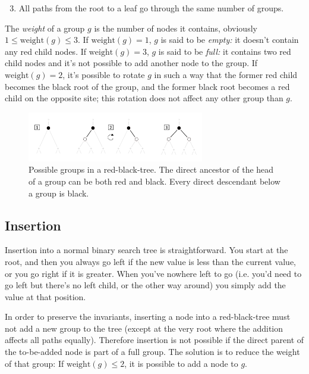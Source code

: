 \documentclass{article}
\begin{document}
\begin{enumerate}[label=(\arabic*)]
\setcounter{enumi}{2}
\item All paths from the root to a leaf go through the same number of groups.
\end{enumerate}

The \emph{weight} of a group \(g\) is the number of nodes it contains, obviously \(1
\leq \text{weight}(g) \leq 3\). If \(\text{weight}(g) = 1\), \(g\) is said to be
\emph{empty:} it doesn't contain any red child nodes.  If \(\text{weight}(g) = 3\),
\(g\) is said to be \emph{full:} it contains two red child nodes and it's not possible
to add another node to the group.  If \(\text{weight}(g) = 2\), it's possible to rotate
\(g\) in such a way that the former red child becomes the black root of the group, and
the former black root becomes a red child on the opposite site; this rotation does not
affect any other group than \(g\).

\begin{figure}
\begin{centering}
    \includegraphics[scale=2]{img/groups.pdf}
    \caption{Possible groups in a red-black-tree. The direct ancestor of the head of a
    group can be both red and black. Every direct descendant below a group is black.}
\end{centering}
\end{figure}

\subsection{Insertion}
Insertion into a normal binary search tree is straightforward. You start at the root,
and then you always go left if the new value is less than the current value, or you go
right if it is greater. When you've nowhere left to go (i.e. you'd need to go left but
there's no left child, or the other way around) you simply add the value at that
position.

In order to preserve the invariants, inserting a node into a red-black-tree must not add
a new group to the tree (except at the very root where the addition affects all paths
equally).  Therefore insertion is not possible if the direct parent of the to-be-added
node is part of a full group. The solution is to reduce the weight of that group: If \(
\text{weight}(g) \leq 2\), it is possible to add a node to \(g\).
\end{document}
